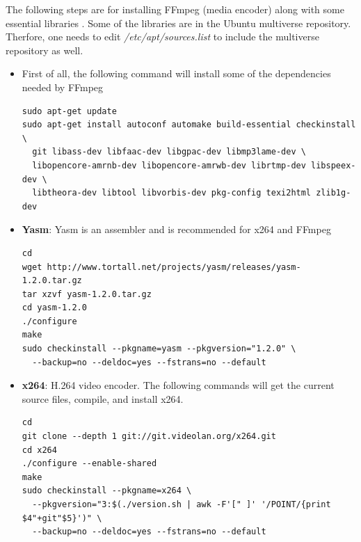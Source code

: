 The following steps are for installing FFmpeg (media encoder) along with some essential libraries \cite{ffmpeg_compile}. Some of the libraries are in the Ubuntu multiverse repository. Therfore, one needs to edit \textit{/etc/apt/sources.list} to include the multiverse repository as well.

\begin{itemize}
\item First of all, the following command will install some of the dependencies needed by FFmpeg

\begin{code}
\begin{verbatim}
sudo apt-get update
sudo apt-get install autoconf automake build-essential checkinstall \
  git libass-dev libfaac-dev libgpac-dev libmp3lame-dev \
  libopencore-amrnb-dev libopencore-amrwb-dev librtmp-dev libspeex-dev \
  libtheora-dev libtool libvorbis-dev pkg-config texi2html zlib1g-dev
\end{verbatim}
\end{code}

\item{\textbf{Yasm}:} Yasm is an assembler and is recommended for x264 and FFmpeg

\begin{code}
\begin{verbatim}
cd
wget http://www.tortall.net/projects/yasm/releases/yasm-1.2.0.tar.gz
tar xzvf yasm-1.2.0.tar.gz
cd yasm-1.2.0
./configure
make
sudo checkinstall --pkgname=yasm --pkgversion="1.2.0" \
  --backup=no --deldoc=yes --fstrans=no --default
\end{verbatim}
\end{code}

\item{\textbf{x264}:} H.264 video encoder. The following commands will get the current source files, compile, and install x264.
 
\begin{code}
\begin{verbatim}
cd
git clone --depth 1 git://git.videolan.org/x264.git
cd x264
./configure --enable-shared
make
sudo checkinstall --pkgname=x264 \
  --pkgversion="3:$(./version.sh | awk -F'[" ]' '/POINT/{print $4"+git"$5}')" \
  --backup=no --deldoc=yes --fstrans=no --default 
\end{verbatim}
\end{code}


\end{itemize}
